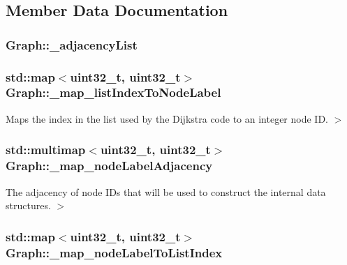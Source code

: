 \subsection{Member Data Documentation}
\hypertarget{classGraph_a18f350623c272fa0988f70c299895a8a}{
\subsubsection[{\-\_\-adjacency\-List}]{ Graph\-::\-\_\-adjacency\-List}}\label{classGraph_a18f350623c272fa0988f70c299895a8a}
\hypertarget{classGraph_a991d6f0ebad396b5acfc10b6787530ec}{
\subsubsection[{\-\_\-map\-\_\-list\-Index\-To\-Node\-Label}]{\setlength{\rightskip}{0pt plus 5cm}std\-::map$<$uint32\-\_\-t, uint32\-\_\-t$>$ Graph\-::\-\_\-map\-\_\-list\-Index\-To\-Node\-Label}}\label{classGraph_a991d6f0ebad396b5acfc10b6787530ec}


Maps the index in the list used by the Dijkstra code to an integer node I\-D. $>$ 

\hypertarget{classGraph_abdd870b000b22aecd02ab84e18666914}{
\subsubsection[{\-\_\-map\-\_\-node\-Label\-Adjacency}]{\setlength{\rightskip}{0pt plus 5cm}std\-::multimap$<$uint32\-\_\-t, uint32\-\_\-t$>$ Graph\-::\-\_\-map\-\_\-node\-Label\-Adjacency}}\label{classGraph_abdd870b000b22aecd02ab84e18666914}


The adjacency of node I\-Ds that will be used to construct the internal data structures. $>$ 

\hypertarget{classGraph_a56f4b3715081a555236768f48260caee}{
\subsubsection[{\-\_\-map\-\_\-node\-Label\-To\-List\-Index}]{\setlength{\rightskip}{0pt plus 5cm}std\-::map$<$uint32\-\_\-t, uint32\-\_\-t$>$ Graph\-::\-\_\-map\-\_\-node\-Label\-To\-List\-Index}}\label{classGraph_a56f4b3715081a555236768f48260caee}


